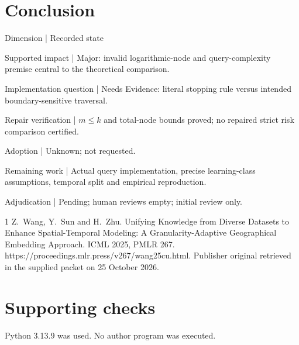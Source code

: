 \documentclass[10pt]{article}
\begin{document}
\section*{Conclusion}
Dimension | Recorded state\par
Supported impact | Major: invalid logarithmic-node and query-complexity premise central to the theoretical comparison.\par
Implementation question | Needs Evidence: literal stopping rule versus intended boundary-sensitive traversal.\par
Repair verification | \(m\leq k\) and total-node bounds proved; no repaired strict risk comparison certified.\par
Adoption | Unknown; not requested.\par
Remaining work | Actual query implementation, precise learning-class assumptions, temporal split and empirical reproduction.\par
Adjudication | Pending; human reviews empty; initial review only.\par
1 Z. Wang, Y. Sun and H. Zhu. Unifying Knowledge from Diverse Datasets to Enhance Spatial-Temporal Modeling: A Granularity-Adaptive Geographical Embedding Approach. ICML 2025, PMLR 267. https://proceedings.mlr.press/v267/wang25cu.html. Publisher original retrieved in the supplied packet on 25 October 2026.\par
\section*{Supporting checks}
Python 3.13.9 was used. No author program was executed.\par
\end{document}
